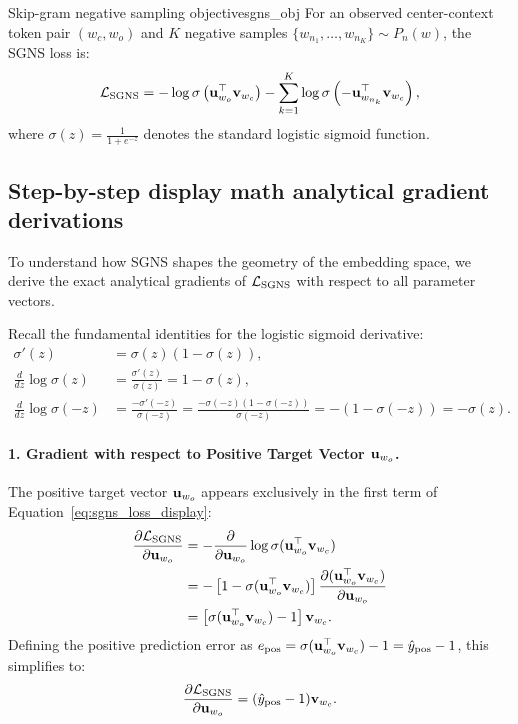 \documentclass[../../main.tex]{subfiles}
\begin{document}
\begin{definition}{Skip-gram negative sampling objective}{sgns_obj}
For an observed center-context token pair $(w_c, w_o)$ and $K$ negative samples $\{w_{n_1}, \dots, w_{n_K}\} \sim P_n(w)$, the SGNS loss is:
\begin{equation}
\label{eq:sgns_loss_display}
\mathcal{L}_{\text{SGNS}} = -\log \sigma\left( \mathbf{u}_{w_o}^\top \mathbf{v}_{w_c} \right) - \sum_{k=1}^K \log \sigma\left( -\mathbf{u}_{w_{n_k}}^\top \mathbf{v}_{w_c} \right),
\end{equation}
where $\sigma(z) = \frac{1}{1 + e^{-z}}$ denotes the standard logistic sigmoid function.
\end{definition}

\subsection{Step-by-step display math analytical gradient derivations}
\label{subsec:sgns_gradients}

To understand how SGNS shapes the geometry of the embedding space, we derive the exact analytical gradients of $\mathcal{L}_{\text{SGNS}}$ with respect to all parameter vectors.

Recall the fundamental identities for the logistic sigmoid derivative:
\begin{align}
\label{eq:sigmoid_deriv_identity}
\sigma'(z) &= \sigma(z)(1 - \sigma(z)), \\
\label{eq:log_sigmoid_pos}
\frac{d}{dz} \log \sigma(z) &= \frac{\sigma'(z)}{\sigma(z)} = 1 - \sigma(z), \\
\label{eq:log_sigmoid_neg}
\frac{d}{dz} \log \sigma(-z) &= \frac{-\sigma'(-z)}{\sigma(-z)} = \frac{-\sigma(-z)(1 - \sigma(-z))}{\sigma(-z)} = -(1 - \sigma(-z)) = -\sigma(z).
\end{align}

\paragraph{1. Gradient with respect to Positive Target Vector $\mathbf{u}_{w_o}$.}
The positive target vector $\mathbf{u}_{w_o}$ appears exclusively in the first term of Equation~\eqref{eq:sgns_loss_display}:
\begin{align}
\frac{\partial \mathcal{L}_{\text{SGNS}}}{\partial \mathbf{u}_{w_o}} &= -\frac{\partial}{\partial \mathbf{u}_{w_o}} \log \sigma(\mathbf{u}_{w_o}^\top \mathbf{v}_{w_c}) \notag \\
&= -\left[ 1 - \sigma(\mathbf{u}_{w_o}^\top \mathbf{v}_{w_c}) \right] \frac{\partial (\mathbf{u}_{w_o}^\top \mathbf{v}_{w_c})}{\partial \mathbf{u}_{w_o}} \notag \\
\label{eq:grad_u_pos}
&= \left[ \sigma(\mathbf{u}_{w_o}^\top \mathbf{v}_{w_c}) - 1 \right] \mathbf{v}_{w_c}.
\end{align}
Defining the positive prediction error as $e_{\text{pos}} = \sigma(\mathbf{u}_{w_o}^\top \mathbf{v}_{w_c}) - 1 = \hat{y}_{\text{pos}} - 1$, this simplifies to:
\begin{equation}
\label{eq:grad_u_pos_clean}
\frac{\partial \mathcal{L}_{\text{SGNS}}}{\partial \mathbf{u}_{w_o}} = (\hat{y}_{\text{pos}} - 1) \mathbf{v}_{w_c}.
\end{equation}
\end{document}
